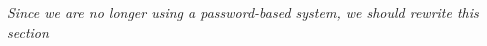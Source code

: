 \documentclass[fullpage]{article}
\begin{document}
\emph{Since we are no longer using a password-based system, we should rewrite this section}
\begin{comment}
\subsubsection*{Explanation}
Depending on how the user stores their password (written down or in a file on the computer), an attacker may attain the user's password through various means. Ergo, the attacker may impersonate the user on Book Bazar. A worst-case-scenario would be if the user uses the same password for multiple services and the attacker could now access all these other services using the user's password.

\subsubsection*{Cause of Event}
One of the means via which the attacker may acquire a user's password is by accessing the database where the information regarding the password is stored. This could be done either via a remote connection or physically accessing the computer. Another means of acquiring the user's password would be  via a man-in-the-middle attack, where some or all of the user's network communication is first routed to the attacker before reaching its intended destination. Lastly, an attacker may use a social engineering scheme to trick a user into providing the password to a service that may seem affiliated with Book Bazar but in-reality is completely separate.

\subsubsection*{Mitigation}
We shall assume the security of the email provided by McMaster University. We will use the user's McMaster email to authenticate the user. Book Bazar shall work without storing the user's password or any information related to the password, like the hash of the password. This would ensure that, even if Book Bazar's database were to be compromised, the user's passwords may not be obtained. Furthermore, we shall ensure that any requests between the user and our servers will use HTTPS, preventing man-in-the-middle attacks.

\subsubsection*{Safety Requirements}
Section 11.6 of our System Requirements Rev0 document covers this hazard.

\end{comment}
\end{document}
